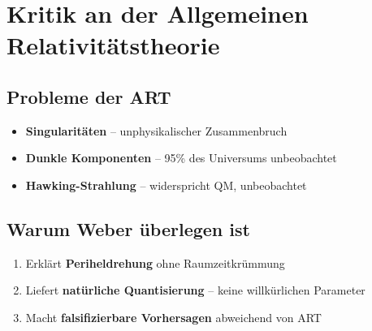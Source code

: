 \section{Kritik an der Allgemeinen Relativitätstheorie}
\subsection{Probleme der ART}
\begin{itemize}
\item \textbf{Singularitäten} – unphysikalischer Zusammenbruch
\item \textbf{Dunkle Komponenten} – 95\% des Universums unbeobachtet
\item \textbf{Hawking-Strahlung} – widerspricht QM, unbeobachtet
\end{itemize}

\subsection{Warum Weber überlegen ist}
\begin{enumerate}
\item Erklärt \textbf{Periheldrehung} ohne Raumzeitkrümmung
\item Liefert \textbf{natürliche Quantisierung} – keine willkürlichen Parameter
\item Macht \textbf{falsifizierbare Vorhersagen} abweichend von ART
\end{enumerate}